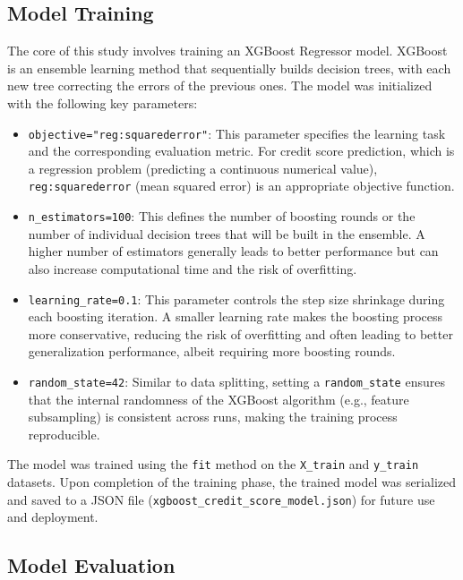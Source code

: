 \documentclass{article}
\begin{document}
\subsection{Model Training}

The core of this study involves training an XGBoost Regressor model. XGBoost is an ensemble learning method that sequentially builds decision trees, with each new tree correcting the errors of the previous ones. The model was initialized with the following key parameters:

\begin{itemize}
    \item \texttt{objective="reg:squarederror"}: This parameter specifies the learning task and the corresponding evaluation metric. For credit score prediction, which is a regression problem (predicting a continuous numerical value), \texttt{reg:squarederror} (mean squared error) is an appropriate objective function.

    \item \texttt{n\_estimators=100}: This defines the number of boosting rounds or the number of individual decision trees that will be built in the ensemble. A higher number of estimators generally leads to better performance but can also increase computational time and the risk of overfitting.

    \item \texttt{learning\_rate=0.1}: This parameter controls the step size shrinkage during each boosting iteration. A smaller learning rate makes the boosting process more conservative, reducing the risk of overfitting and often leading to better generalization performance, albeit requiring more boosting rounds.

    \item \texttt{random\_state=42}: Similar to data splitting, setting a \texttt{random\_state} ensures that the internal randomness of the XGBoost algorithm (e.g., feature subsampling) is consistent across runs, making the training process reproducible.
\end{itemize}

The model was trained using the \texttt{fit} method on the \texttt{X\_train} and \texttt{y\_train} datasets. Upon completion of the training phase, the trained model was serialized and saved to a JSON file (\texttt{xgboost\_credit\_score\_model.json}) for future use and deployment.

\subsection{Model Evaluation}
\end{document}
